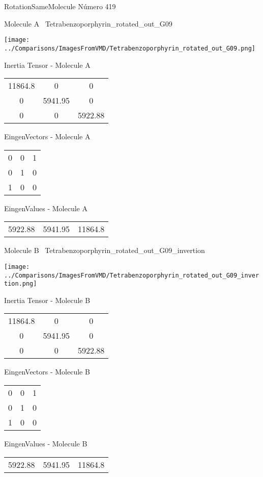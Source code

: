 \vtab[-3cm]
\begin{center}
{\large RotationSameMolecule \tab Número 419}
\end{center}
\begin{multicols}{2}
\begin{center}

Molecule A \
Tetrabenzoporphyrin\_rotated\_out\_G09

\texttt{[image: ../Comparisons/ImagesFromVMD/Tetrabenzoporphyrin\_rotated\_out\_G09.png]}

Inertia Tensor - Molecule A \\
\begin{tabular}{|c c c|}
11864.8	 & 	0	 & 	0	 \\
0	 & 	5941.95	 & 	0	 \\
0	 & 	0	 & 	5922.88
\end{tabular}

\vtab
 EingenVectors - Molecule A     \\
\begin{tabular}{|c c c|}
0	 & 	0	 & 	1	 \\
0	 & 	1	 & 	0	 \\
1	 & 	0	 & 	0
\end{tabular}

\vtab
 EingenValues - Molecule A     \\
\begin{tabular}{|c c c|}
5922.88	 & 	5941.95	 & 	11864.8	 \\
\end{tabular}
\columnbreak

Molecule B \
Tetrabenzoporphyrin\_rotated\_out\_G09\_invertion

\texttt{[image: ../Comparisons/ImagesFromVMD/Tetrabenzoporphyrin\_rotated\_out\_G09\_invertion.png]}

Inertia Tensor - Molecule B \\
\begin{tabular}{|c c c|}
11864.8	 & 	0	 & 	0	 \\
0	 & 	5941.95	 & 	0	 \\
0	 & 	0	 & 	5922.88
\end{tabular}

\vtab
 EingenVectors - Molecule B     \\
\begin{tabular}{|c c c|}
0	 & 	0	 & 	1	 \\
0	 & 	1	 & 	0	 \\
1	 & 	0	 & 	0
\end{tabular}

\vtab
 EingenValues - Molecule B     \\
\begin{tabular}{|c c c|}
5922.88	 & 	5941.95	 & 	11864.8	 \\
\end{tabular}

\end{center}
\end{multicols}

